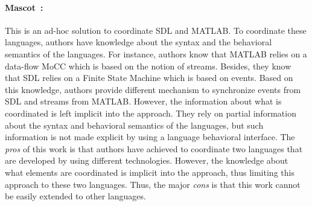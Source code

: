  
{\paragraph{Mascot~\cite{mascotbib}:}
This is an ad-hoc solution to coordinate SDL and MATLAB. To coordinate these languages, authors have knowledge about the syntax and the behavioral semantics of the languages. For instance, authors know that MATLAB relies on a data-flow MoCC which is based on the notion of streams. Besides, they know that SDL relies on a Finite State Machine which is based on events. Based on this knowledge, authors provide different mechanism to synchronize events from SDL and streams from MATLAB. However, the information about what is coordinated is left implicit into the approach. They rely on partial information about the syntax and behavioral semantics of the languages, but such information is not made explicit by using a language behavioral interface. The \emph{pros} of this work is that authors have achieved to coordinate two languages that are developed by using different technologies. However, the knowledge about what elements are coordinated is implicit into the approach, thus limiting this approach to these two languages. Thus, the major \emph{cons} is that this work cannot be easily extended to other languages. 
	



}
